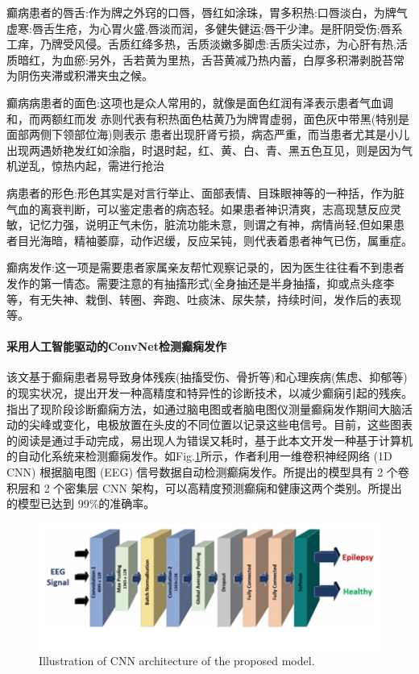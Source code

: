 \documentclass[letterpaper,12pt]{article}
\begin{document}
			癫病患者的唇舌:作为牌之外窍的口唇，唇红如涂珠，胃多积热:口唇淡白，为牌气虚寒:唇舌生疮，为心胃火盛,唇淡而润，多健失健运;唇干少津。是肝阴受伤;唇系工痒，乃牌受风侵。舌质红绛多热，舌质淡嫩多脚虑:舌质尖过赤，为心肝有热,活质暗红，为血瘀:另外，舌若黄为里热，舌苔黄减乃热内蓄，白厚多积滞剥脱苔常为阴伤夹滞或积滞夹虫之候。
			
			癫病病患者的面色:这项也是众人常用的，就像是面色红润有泽表示患者气血调和，而两额红而发 赤则代表有积热面色枯黄乃为牌胃虚弱，面色灰中带黑(特别是面部两侧下领部位海)则表示 患者出现肝肾亏损，病态严重，而当患者尤其是小儿出现两遇娇艳发红如涂脂，时退时起，红、黄、白、青、黑五色互见，则是因为气机逆乱，惊热内起，需进行抢治
			
			病患者的形色:形色其实是对言行举止、面部表情、目珠眼神等的一种括，作为脏气血的离衰判断，可以鉴定患者的病态轻。如果患者神识清爽，志高现慧反应灵敏，记忆力强，说明正气未伤，脏流功能未意，则谓之有神，病情尚轻,但如果患者目光海暗，精袖萎靡，动作迟缓，反应呆钝，则代表着患者神气已伤，属重症。
			
			癫病发作:这一项是需要患者家属亲友帮忙观察记录的，因为医生往往看不到患者发作的第一情态。需要注意的有抽搐形式(全身抽还是半身抽搐，抑或点头痉李等，有无失神、栽倒、转圈、奔跑、吐痰沫、尿失禁，持续时间，发作后的表现等。
		
				\paragraph{采用人工智能驱动的ConvNet检测癫痫发作}\qquad
				
				该文基于癫痫患者易导致身体残疾(抽搐受伤、骨折等)和心理疾病(焦虑、抑郁等)的现实状况，提出开发一种高精度和特异性的诊断技术，以减少癫痫引起的残疾\cite{ConVNet}。指出了现阶段诊断癫痫方法，如通过脑电图或者脑电图仪测量癫痫发作期间大脑活动的尖峰或变化，电极放置在头皮的不同位置以记录这些电信号。目前，这些图表的阅读是通过手动完成，易出现人为错误又耗时，基于此本文开发一种基于计算机的自动化系统来检测癫痫发作。如Fig.\ref{fig:ConvNet}所示，作者利用一维卷积神经网络 (1D CNN) 根据脑电图 (EEG) 信号数据自动检测癫痫发作。所提出的模型具有 2 个卷积层和 2 个密集层 CNN 架构，可以高精度预测癫痫和健康这两个类别。所提出的模型已达到 99\%的准确率。
				
				\begin{figure}[ht] 
					\centering \includegraphics[width=0.8\columnwidth]{ConvNet}
					\caption{
						\label{fig:ConvNet} %
						Illustration of CNN architecture of the proposed model.
					}
				\end{figure}
				
\end{document}

